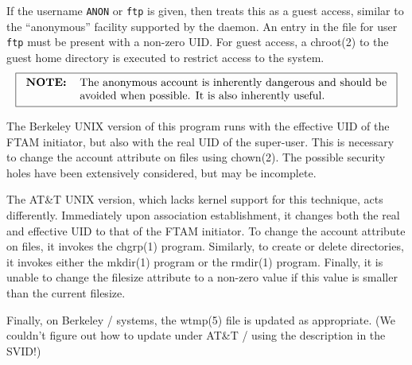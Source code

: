 If the username \verb"ANON" or \verb"ftp" is given,
then  treats this as a guest access,
similar to the ``anonymous'' facility supported by the  daemon.
An entry in the  file for user
\verb"ftp" must be present with a non-zero UID.
For guest access,
a \man chroot(2) to the guest home directory
is executed to restrict access to the system.
\[\fbox{\begin{tabular}{lp{0.8\textwidth}}
\bf NOTE:&	The anonymous account is inherently dangerous and should be
		avoided when possible.
		It is also inherently useful.
\end{tabular}}\]

The Berkeley UNIX version of this program runs with the effective UID of the
FTAM initiator,
but also with the real UID of the super-user.
This is necessary to change the account attribute on files
using \man chown(2).
The possible security holes have been extensively considered,
but may be incomplete.

The AT\&T UNIX version,
which lacks kernel support for this technique, acts differently.
Immediately upon association establishment,
it changes both the real and effective UID to that of the FTAM initiator.
To change the account attribute on files,
it invokes the \man chgrp(1) program.
Similarly, to create or delete directories,
it invokes either the \man mkdir(1) program or the \man rmdir(1) program.
Finally,
it is unable to change the filesize attribute to a non-zero value
if this value is smaller than the current filesize.

Finally,
on Berkeley \unix/ systems,
the \man wtmp(5) file is updated as appropriate.
(We couldn't figure out how to update  under AT\&T \unix/
using the description in the SVID!)

